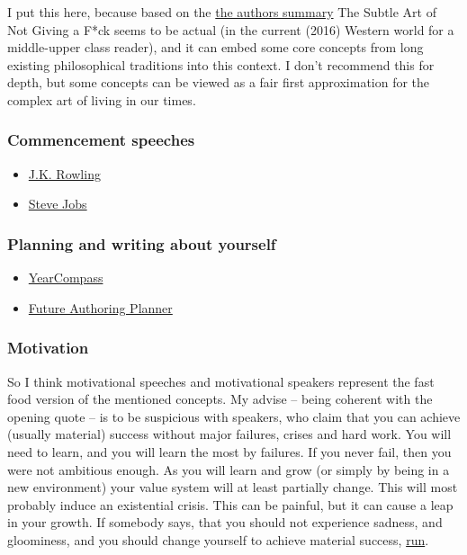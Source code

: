 \documentclass{article}
\begin{document}
I put this here, because based on the \href{https://www.youtube.com/watch?v=lz8sUiXAnbs}{the authors summary} The Subtle Art of Not Giving a F*ck seems to be actual (in the current (2016) Western world for a middle-upper class reader), and it can embed some core concepts from long existing philosophical traditions into this context.
I don't recommend this for depth, but some concepts can be viewed as a fair first approximation for the complex art of living in our times.


\subsubsection{Commencement speeches}

\begin{itemize}
    \item \href{https://www.youtube.com/watch?v=UibfDUPJAEU}{J.K. Rowling}
    \item \href{https://www.youtube.com/watch?v=UF8uR6Z6KLc}{Steve Jobs} 
\end{itemize}




\subsubsection{Planning and writing about yourself}

\begin{itemize}
    \item \href{https://yearcompass.com/}{YearCompass}
    \item \href{http://web.archive.org/web/20210202023126/https://thecharacterarc.com/wp-content/uploads/2019/01/Future-Authoring-Planner-by-The-Character-Arc.pdf}{Future Authoring Planner}
\end{itemize}



\subsubsection{Motivation}

So I think motivational speeches and motivational speakers represent the fast food version of the mentioned concepts. My advise – being coherent with the opening quote – is to be suspicious with speakers, who claim that you can achieve (usually material) success without major failures, crises and hard work.
You will need to learn, and you will learn the most by failures. If you never fail, then you were not ambitious enough.
As you will learn and grow (or simply by being in a new environment) your value system will at least partially change. This will most probably induce an existential crisis. This can be painful, but it can cause a leap in your growth.
If somebody says, that you should not experience sadness, and gloominess, and you should change yourself to achieve material success, \href{https://www.youtube.com/watch?v=NA4uTFeHEFA}{run}.
\end{document}
